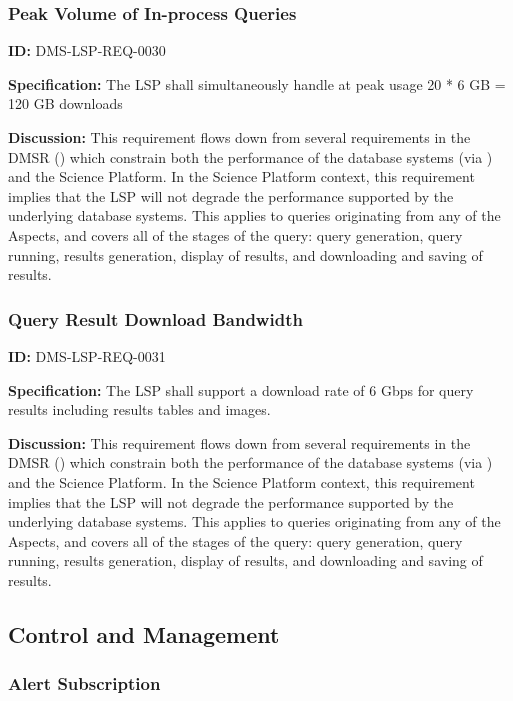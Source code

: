\documentclass[SE,toc,lsstdraft]{lsstdoc}
\begin{document}
\subsubsection{Peak Volume of In-process Queries}

\label{DMS-LSP-REQ-0030}
\textbf{ID:} DMS-LSP-REQ-0030

\textbf{Specification:}
The LSP shall simultaneously handle at peak usage 20 * 6 GB = 120 GB downloads

\textbf{Discussion:}
This requirement flows down from several requirements in the DMSR () which constrain both the performance of the database systems (via ) and the Science Platform.  In the Science Platform context, this requirement implies that the LSP will not degrade the performance supported by the underlying database systems.  This applies to queries originating from any of the Aspects, and covers all of the stages of the query: query generation, query running, results generation, display of results, and downloading and saving of results.

\subsubsection{Query Result Download Bandwidth}

\label{DMS-LSP-REQ-0031}
\textbf{ID:} DMS-LSP-REQ-0031

\textbf{Specification:}
The LSP shall support a download rate of 6 Gbps for query results including results tables and images.

\textbf{Discussion:}
This requirement flows down from several requirements in the DMSR () which constrain both the performance of the database systems (via ) and the Science Platform.  In the Science Platform context, this requirement implies that the LSP will not degrade the performance supported by the underlying database systems.  This applies to queries originating from any of the Aspects, and covers all of the stages of the query: query generation, query running, results generation, display of results, and downloading and saving of results.

\subsection{Control and Management}

\subsubsection{Alert Subscription}
\end{document}
